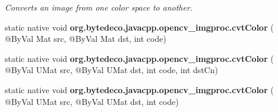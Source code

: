 \begin{DoxyCompactItemize}
\begin{DoxyCompactList}\small\item\em Converts an image from one color space to another. \end{DoxyCompactList}\item 
\mbox{\label{group__imgproc__misc_gaa8e0dcca6becdd3148e241a90e29e670}} 
static native void {\bfseries org.\+bytedeco.\+javacpp.\+opencv\+\_\+imgproc.\+cvt\+Color} ( @By\+Val Mat src, @By\+Val Mat dst, int code)
\item 
\mbox{\label{group__imgproc__misc_gaa8da1141a7257ac493670f5e3ff57ee6}} 
static native void {\bfseries org.\+bytedeco.\+javacpp.\+opencv\+\_\+imgproc.\+cvt\+Color} ( @By\+Val U\+Mat src, @By\+Val U\+Mat dst, int code, int dst\+Cn)
\item 
\mbox{\label{group__imgproc__misc_ga1f5d494e7dc7978e2c6ead86fbb90aad}} 
static native void {\bfseries org.\+bytedeco.\+javacpp.\+opencv\+\_\+imgproc.\+cvt\+Color} ( @By\+Val U\+Mat src, @By\+Val U\+Mat dst, int code)
\end{DoxyCompactItemize}
